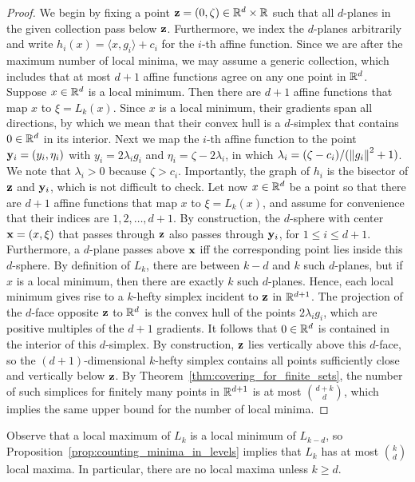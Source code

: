 \documentclass[a4paper,UKenglish,cleveref, autoref,numberwithinsect]{socg-lipics-v2021}
\newcommand {\mm}[1] {\ifmmode{#1}\else{\mbox{\(#1\)}}\fi}
\newcommand {\scalprod}[2] {{\langle #1 , #2 \rangle}}
\theoremstyle{plain}
\newcommand{\Rspace}        {\mm{{\mathbb R}}}
\newcommand{\xxx}           {\mm{\bf{x}}}
\newcommand{\yyy}           {\mm{\bf{y}}}
\newcommand{\zzz}           {\mm{\bf{z}}}
\newcommand{\norm}[1]       {\mm{\|{#1}\|}}
\begin{document}
\begin{proof}
  We begin by fixing a point $\zzz = (0, \zeta) \in \Rspace^d \times \Rspace$ such that all $d$-planes in the given collection pass below $\zzz$.
  Furthermore, we index the $d$-planes arbitrarily and write $h_i(x) = \scalprod{x}{g_i} + c_i$
  for the $i$-th affine function.
  Since we are after the maximum number of local minima, we may assume a generic collection, which includes that at most $d+1$ affine functions agree on any one point in $\Rspace^d$.
  \smallskip
  Suppose $x \in \Rspace^d$ is a local minimum.
  Then there are $d+1$ affine functions that map $x$ to $\xi = L_k(x)$.
  Since $x$ is a local minimum, their gradients span all directions, by which we mean that their convex hull is a $d$-simplex that contains $0 \in \Rspace^d$ in its interior.
  Next we map the $i$-th affine function to the point $\yyy_i = (y_i, \eta_i)$ with $y_i = 2 \lambda_i g_i$ and $\eta_i = \zeta - 2 \lambda_i$, in which $\lambda_i = ({\zeta - c_i}) / ({\norm{g_i}^2 + 1})$.
  We note that $\lambda_i > 0$ because $\zeta > c_i$.
  Importantly, the graph of $h_i$ is the bisector of $\zzz$ and $\yyy_i$, which is not difficult to check.
  \smallskip
  Let now $x \in \Rspace^d$ be a point so that there are $d+1$ affine functions that map $x$ to $\xi = L_k(x)$, and assume for convenience that their indices are $1, 2, \ldots, d+1$.
  By construction, the $d$-sphere with center $\xxx = (x, \xi)$ that passes through $\zzz$ also passes through $\yyy_i$, for $1 \leq i \leq d+1$.
  Furthermore, a $d$-plane passes above $\xxx$ iff the corresponding point lies inside this $d$-sphere.
  By definition of $L_k$, there are between $k-d$ and $k$ such $d$-planes, but if $x$ is a local minimum, then there are exactly $k$ such $d$-planes.
  Hence, each local minimum gives rise to a $k$-hefty simplex incident to $\zzz$ in $\Rspace^{d+1}$.
  The projection of the $d$-face opposite $\zzz$ to $\Rspace^d$ is the convex hull of the points $2 \lambda_i g_i$, which are positive multiples of the $d+1$ gradients.
  It follows that $0 \in \Rspace^d$ is contained in the interior of this $d$-simplex.
  By construction, $\zzz$ lies vertically above this $d$-face, so the $(d+1)$-dimensional $k$-hefty simplex contains all points sufficiently close and vertically below $\zzz$.
  By Theorem~\ref{thm:covering_for_finite_sets}, the number of such simplices for finitely many points in $\Rspace^{d+1}$ is at most $\binom{d+k}{d}$, which implies the same upper bound for the number of local minima.
\end{proof}
Observe that a local maximum of $L_k$ is a local minimum of $L_{k-d}$, so Proposition~\ref{prop:counting_minima_in_levels} implies that $L_k$ has at most $\binom{k}{d}$ local maxima.
In particular, there are no local maxima unless $k \geq d$.
\end{document}

